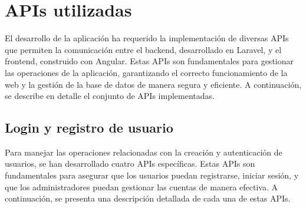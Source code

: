 \section{APIs utilizadas}\label{sec:apartado}

El desarrollo de la aplicación ha requerido la implementación de diversas APIs que permiten la comunicación entre el backend, desarrollado en Laravel, y el frontend, construido con Angular. Estas APIs son fundamentales para gestionar las operaciones de la aplicación, garantizando el correcto funcionamiento de la web y la gestión de la base de datos de manera segura y eficiente. A continuación, se describe en detalle el conjunto de APIs implementadas.

\subsection{Login y registro de usuario}\label{subsec5.3.1}

Para manejar las operaciones relacionadas con la creación y autenticación de usuarios, se han desarrollado cuatro APIs específicas. Estas APIs son fundamentales para asegurar que los usuarios puedan registrarse, iniciar sesión, y que los administradores puedan gestionar las cuentas de manera efectiva. A continuación, se presenta una descripción detallada de cada una de estas APIs.

